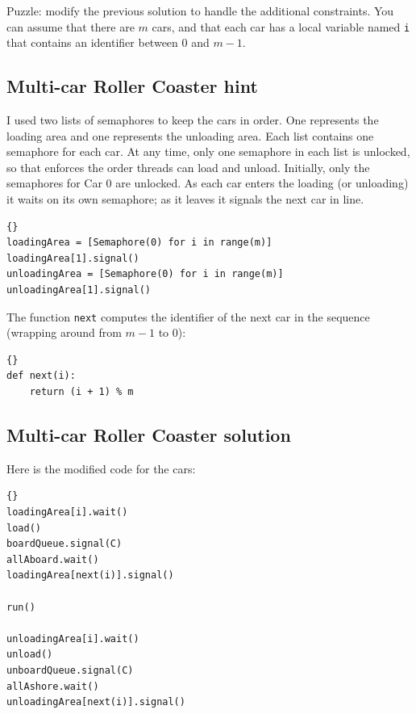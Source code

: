 \documentclass{book}
\newcommand{\clearemptydoublepage}{\newpage\cleardoublepage}
\begin{document}
Puzzle: modify
the previous solution to handle the additional constraints.
You can assume that there are $m$ cars, and that
each car has a local variable named {\tt i}
that contains an identifier between 0 and $m-1$.


\clearemptydoublepage
\subsection{Multi-car Roller Coaster hint}

I used two lists of semaphores to keep the cars in order.  One
represents the loading area and one represents the unloading area.
Each list contains one semaphore for each car.
At any time, only one semaphore in each
list is unlocked, so that enforces the order threads can
load and unload.
Initially, only the semaphores for Car 0 are unlocked.
As each car enters the
loading (or unloading) it waits on its own semaphore; as it leaves it
signals the next car in line.

\begin{lstlisting}[caption={Multi-car Roller Coaster hint}]{}
loadingArea = [Semaphore(0) for i in range(m)]
loadingArea[1].signal()
unloadingArea = [Semaphore(0) for i in range(m)]
unloadingArea[1].signal()
\end{lstlisting}

The function {\tt next} computes the identifier of the next
car in the sequence (wrapping around from $m-1$ to 0):

\begin{lstlisting}[caption={Implementation of {\tt next}}]{}
def next(i):
    return (i + 1) % m
\end{lstlisting}



\clearemptydoublepage
\subsection{Multi-car Roller Coaster solution}

Here is the modified code for the cars:

\begin{lstlisting}[caption={Multi-car Roller Coaster solution (car)}]{}
loadingArea[i].wait()
load()
boardQueue.signal(C)
allAboard.wait()
loadingArea[next(i)].signal()

run()

unloadingArea[i].wait()
unload()
unboardQueue.signal(C)
allAshore.wait()
unloadingArea[next(i)].signal()
\end{lstlisting}
\end{document}
